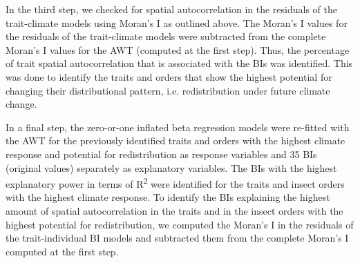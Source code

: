 In the third step, we checked for spatial autocorrelation in the residuals of the trait-climate models using Moran's I as outlined above. The Moran's I values for the residuals of the trait-climate models were subtracted from the complete Moran's I values for the AWT (computed at the first step). Thus, the percentage of trait spatial autocorrelation that is associated with the BIs was identified. This was done to identify the traits and orders that show the highest potential for changing their distributional pattern, i.e. redistribution under future climate change.

In a final step, the zero-or-one inflated beta regression models were re-fitted with the AWT for the previously identified traits and orders with the highest climate response and potential for redistribution as response variables and 35 BIs (original values) separately as explanatory variables. The BIs with the highest explanatory power in terms of R\textsuperscript{2} were identified for the traits and insect orders with the highest climate response. To identify the BIs explaining the highest amount of spatial autocorrelation in the traits and in the insect orders with the highest potential for redistribution, we computed the Moran's I in the residuals of the trait-individual BI models and subtracted them from the complete Moran's I computed at the first step.

